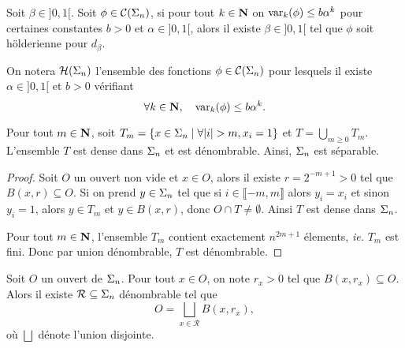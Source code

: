   \begin{proposition}
    Soit $\beta \in ]0, 1[$.
    Soit $\phi \in \mathcal{C} (\Sigma_{n})$, si pour tout $k \in \mathbf N$ on $\operatorname{var}_k(\phi) \leq b\alpha^k$ pour certaines constantes $b > 0$ et $\alpha \in ]0, 1[$,
    alors il existe $\beta \in ]0, 1[$ tel que $\phi$ soit hölderienne pour $d_{\beta}$.
  \end{proposition}

  \begin{definition}
    On notera $\mathcal{H} (\Sigma_{n})$ l'ensemble des fonctions $\phi \in \mathcal{C} (\Sigma_{n})$ pour lesquels il existe $\alpha \in ]0, 1[$ et $b > 0$ vérifiant
    $$\forall k \in \mathbf N, \hspace{1em} \operatorname{var}_k(\phi) \leq b\alpha^k.$$
  \end{definition}


  \begin{proposition} \label{prop:separable}
    Pour tout $m \in \mathbf N$, soit $T_m = \left\{x \in \s_n \mid \forall|i|>m, x_i=1\right\}$ et $T = \bigcup_{m\geq 0}{T_m}$.
    L'ensemble $T$ est dense dans $\Sigma_n$ et est dénombrable. Ainsi, $\Sigma_n$ est séparable.
  \end{proposition}

  \begin{proof}
    Soit $O$ un ouvert non vide et $x \in O$, alors il existe $r = 2^{-m+1} > 0$ tel que $B(x, r) \subseteq O$.
    Si on prend $y \in \Sigma_n$ tel que si $i \in \llbracket -m, m \rrbracket$ alors $y_i = x_i$ et sinon $y_i = 1$,
    alors $y \in T_m$ et $y \in B(x, r)$, donc $O \cap T \not= \emptyset$. Ainsi $T$ est dense dans $\Sigma_n$.

    Pour tout $m \in \mathbf N$, l'ensemble $T_m$ contient exactement $n^{2m+1}$ élements, \textit{ie.} $T_m$ est fini.
    Donc par union dénombrable, $T$ est dénombrable.
  \end{proof}

  \begin{proposition} \label{prop:boules}
    Soit $O$ un ouvert de $\Sigma_n$. Pour tout $x \in O$, on note $r_x > 0$ tel que $B(x, r_x) \subseteq O$.
    Alors il existe $\mathcal R \subseteq \Sigma_n$ dénombrable tel que
    $$O = \bigsqcup_{x\in\mathcal R}{B(x, r_x)},$$
    où $\bigsqcup$ dénote l'union disjointe.
  \end{proposition}

